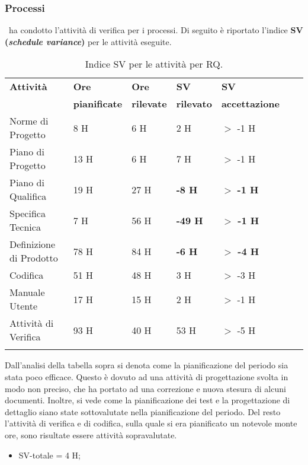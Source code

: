 \subsubsection{Processi}
\gruppo ~ha condotto l'attività di verifica per i processi. Di seguito è riportato l'indice \textbf{SV (\textit{schedule variance})} per le attività eseguite.
\begin{longtable}{lllllXr}
\toprule
\textbf{Attività} & \textbf{Ore} & \textbf{Ore} & \textbf{SV} & \textbf{SV} \\
& \textbf{pianificate} & \textbf{rilevate} & \textbf{rilevato} & \textbf{accettazione}\\
\toprule
Norme di Progetto & 8 H & 6 H & 2 H & $>$ -1 H\\
\midrule
Piano di Progetto & 13 H & 6 H & 7 H & $>$ -1 H\\
\midrule
Piano di Qualifica & 19 H & 27 H & \textbf{-8 H} & $>$ \textbf{-1 H}\\
\midrule
Specifica Tecnica & 7 H & 56 H & \textbf{-49 H} & \textbf{$>$ -1 H}\\
\midrule
Definizione di Prodotto & 78 H & 84 H & \textbf{-6 H} & \textbf{$>$ -4 H}\\
\midrule
Codifica & 51 H & 48 H & 3 H & $>$ -3 H\\
\midrule
Manuale Utente & 17 H & 15 H & 2 H & $>$ -1 H\\
\midrule
Attività di Verifica & 93 H & 40 H & 53 H & $>$ -5 H\\
\bottomrule
\caption{Indice SV per le attività per RQ.}
\end{longtable}
Dall'analisi della tabella sopra si denota come la pianificazione del periodo sia stata poco efficace. Questo è dovuto ad una attività di progettazione svolta in modo non preciso, che ha portato ad una correzione e nuova stesura di alcuni documenti. Inoltre, si vede come la pianificazione dei test e la progettazione di dettaglio siano state sottovalutate nella pianificazione del periodo.
Del resto l'attività di verifica e di codifica, sulla quale si era pianificato un notevole monte ore, sono risultate essere attività sopravalutate.
\begin{itemize}
\item SV-totale = 4 H;
\end{itemize}

